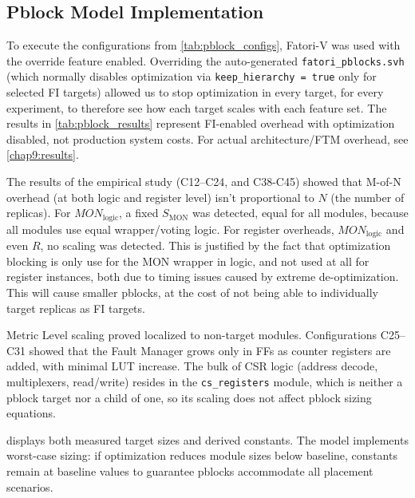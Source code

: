 \subsection{Pblock Model Implementation}
\label{chap7:pblock_implementation}

To execute the configurations from \cref{tab:pblock_configs}, \ac{Fatori-V} was used with the override feature enabled. Overriding the auto-generated \texttt{fatori\_pblocks.svh} (which normally disables optimization via \texttt{keep\_hierarchy = true} only for selected \ac{FI} targets) allowed us to stop optimization in every target, for every experiment, to therefore see how each target scales with each feature set. The results in \cref{tab:pblock_results} represent \ac{FI}-enabled overhead with optimization disabled, not production system costs. For actual architecture/\ac{FTM} overhead, see \cref{chap9:results}.

The results of the empirical study (C12--C24, and C38-C45) showed that M-of-N overhead (at both logic and register level) isn't proportional to $N$ (the number of replicas). For $MON_{\text{logic}}$, a fixed $S_{\text{MON}}$ was detected, equal for all modules, because all modules use equal wrapper/voting logic. For register overheads, $MON_{\text{logic}}$ and even $R$, no scaling was detected. This is justified by the fact that optimization blocking is only use for the MON wrapper in logic, and not used at all for register instances, both due to timing issues caused by extreme de-optimization. This will cause smaller pblocks, at the cost of not being able to individually target replicas as \ac{FI} targets.

Metric Level scaling proved localized to non-target modules. Configurations C25--C31 showed that the Fault Manager grows only in \acp{FF} as counter registers are added, with minimal \ac{LUT} increase. The bulk of \ac{CSR} logic (address decode, multiplexers, read/write) resides in the \texttt{cs\_registers} module, which is neither a pblock target nor a child of one, so its scaling does not affect pblock sizing equations.

 displays both measured target sizes and derived constants. The model implements worst-case sizing: if optimization reduces module sizes below baseline, constants remain at baseline values to guarantee pblocks accommodate all placement scenarios.

